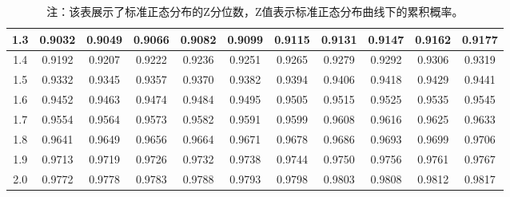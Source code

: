 \documentclass[12pt]{article}
\begin{document}
\begin{table}[H]
\begin{tabular}{|c|c|c|c|c|c|c|c|c|c|c|}
            1.3 & 0.9032 & 0.9049 & 0.9066 & 0.9082 & 0.9099 & 0.9115 & 0.9131 & 0.9147 & 0.9162 & 0.9177 \\ \hline
            1.4 & 0.9192 & 0.9207 & 0.9222 & 0.9236 & 0.9251 & 0.9265 & 0.9279 & 0.9292 & 0.9306 & 0.9319 \\ \hline
            1.5 & 0.9332 & 0.9345 & 0.9357 & 0.9370 & 0.9382 & 0.9394 & 0.9406 & 0.9418 & 0.9429 & 0.9441 \\ \hline
            1.6 & 0.9452 & 0.9463 & 0.9474 & 0.9484 & 0.9495 & 0.9505 & 0.9515 & 0.9525 & 0.9535 & 0.9545 \\ \hline
            1.7 & 0.9554 & 0.9564 & 0.9573 & 0.9582 & 0.9591 & 0.9599 & 0.9608 & 0.9616 & 0.9625 & 0.9633 \\ \hline
            1.8 & 0.9641 & 0.9649 & 0.9656 & 0.9664 & 0.9671 & 0.9678 & 0.9686 & 0.9693 & 0.9699 & 0.9706 \\ \hline
            1.9 & 0.9713 & 0.9719 & 0.9726 & 0.9732 & 0.9738 & 0.9744 & 0.9750 & 0.9756 & 0.9761 & 0.9767 \\ \hline
            2.0 & 0.9772 & 0.9778 & 0.9783 & 0.9788 & 0.9793 & 0.9798 & 0.9803 & 0.9808 & 0.9812 & 0.9817 \\ \hline
        \end{tabular}
        \caption*{\small 注：该表展示了标准正态分布的Z分位数，Z值表示标准正态分布曲线下的累积概率。}
\end{table}
\end{document}
